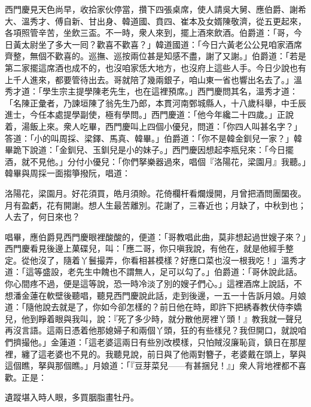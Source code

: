 西門慶見天色尚早，收拾家伙停當，攢下四張桌席，使人請吳大舅、應伯爵、謝希大、溫秀才、傅自新、甘出身、韓道國、賁四、崔本及女婿陳敬濟，從五更起來，各項照管辛苦，坐飲三盃。不一時，衆人來到，擺上酒來飲酒。伯爵道：「哥，今日黃太尉坐了多大一囘？歡喜不歡喜？」韓道國道：「今日六黃老公公見咱家酒席齊整，無個不歡喜的。巡撫、巡按兩位甚是知感不盡，謝了又謝。」伯爵道：「若是第二家擺這席酒也成不的，也沒咱家恁大地方，也沒府上這些人手。今日少說也有上千人進來，都要管待出去。哥就陪了幾兩銀子，咱山東一省也響出名去了。」溫秀才道：「學生宗主提學陳老先生，也在這裡預席。」{}西門慶問其名，溫秀才道：「名陳正彙者，乃諫垣陳了翁先生乃郎，本貫河南鄄城縣人，十八歲科舉，中壬辰進士，今任本處提學副使，極有學問。」西門慶道：「他今年纔二十四歲。」正說着，湯飯上來。衆人吃畢，西門慶叫上四個小優兒，問道：「你四人叫甚名字？」答道：「小的叫周採、梁鐸、馬真、韓畢。」伯爵道：「你不是韓金釧兒一家？」韓畢跪下說道：「金釧兒、玉釧兒是小的妹子。」西門慶因想起李瓶兒來：「今日擺酒，就不見他。」分付小優兒：「你們拏樂器過來，唱個『洛陽花，梁園月』我聽。」韓畢與周採一面搊箏撥阮，唱道：

\begin{myquote} 
{}洛陽花，梁園月。好花須買，皓月須賒。花倚欄杆看爛熳開，月曾把酒問團圞夜。月有盈虧，花有開謝。想人生最苦離別。花謝了，三春近也；月缺了，中秋到也；人去了，何日來也？{}
\end{myquote} 

唱畢，應伯爵見西門慶眼裡酸酸的，便道：「哥教唱此曲，莫非想起過世嫂子來？」西門慶看見後邊上菓碟兒，叫：「應二哥，你只嗔我說，有他在，就是他經手整定。從他沒了，隨着丫鬟撮弄，你看相甚模樣？好應口菜也沒一根我吃！」{}溫秀才道：「這等盛設，老先生中餽也不謂無人，足可以勾了。」伯爵道：「哥休說此話。你心間疼不過，便是這等說，恐一時冷淡了別的嫂子們心。」{}這裡酒席上說話，不想潘金蓮在軟壁後聽唱，聽見西門慶說此話，走到後邊，一五一十告訴月娘。月娘道：「隨他說去就是了，你如今卻怎樣的？前日他在時，即許下把綉春教伏侍李嬌兒，他到睜着眼與我叫，說：『死了多少時，就分散他房裡丫頭！』教我就一聲兒再沒言語。這兩日憑着他那媳婦子和兩個丫頭，狂的有些樣兒？我但開口，就說咱們擠撮他。」金蓮道：「這老婆這兩日有些別改模樣，只怕賊沒廉恥貨，鎮日在那屋裡，纏了這老婆也不見的。我聽見說，前日與了他兩對簪子，老婆戴在頭上，拏與這個瞧，拏與那個瞧。」月娘道：「『豆芽菜兒——有甚捆兒！』」衆人背地裡都不喜歡。正是：

\begin{myquote} 
遺蹤堪入時人眼，多買胭脂畫牡丹。
\end{myquote} 

